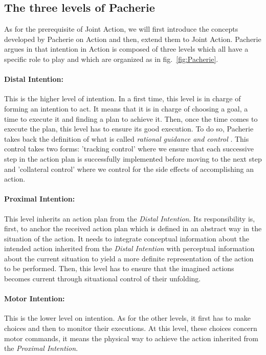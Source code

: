 \documentclass[english,a4paper,11pt,twoside]{StyleThese}
\begin{document}
\subsection{The three levels of Pacherie}

\label{subsec:Pacherie}

As for the prerequisite of Joint Action, we will first introduce the concepts developed by Pacherie on Action and then, extend them to Joint Action. Pacherie argues in \cite{pacherie2008phenomenology} that intention in Action is composed of three levels which all have a specific role to play and which are organized as in fig.~\ref{fig:Pacherie}. 

\paragraph{Distal Intention:} 
This is the higher level of intention. In a first time, this level is in charge of forming an intention to act. It means that it is in charge of choosing a goal, a time to execute it and finding a plan to achieve it. Then, once the time comes to execute the plan, this level has to ensure its good execution. To do so, Pacherie takes back the definition of what is called \textit{rational guidance and control} \cite{buekens2001indexicaliteit}. This control takes two forms: 'tracking control' where we ensure that each successive step in the action plan is successfully implemented before moving to the next step and 'collateral control' where we control for the side effects of accomplishing an action.

\paragraph{Proximal Intention:}
This level inherits an action plan from the \textit{Distal Intention}. Its responsibility is, first, to anchor the received action plan which is defined in an abstract way in the situation of the action. It needs to integrate conceptual information
about the intended action inherited from the \textit{Distal Intention} with perceptual information about the current situation to yield a more definite representation of the action to be performed. Then, this level has to ensure that the imagined actions becomes current through situational control of their unfolding.

\paragraph{Motor Intention:}
This is the lower level on intention. As for the other levels, it first has to make choices and then to monitor their executions. At this level, these choices concern motor commands, it means the physical way to achieve the action inherited from the \textit{Proximal Intention}.
\end{document}
